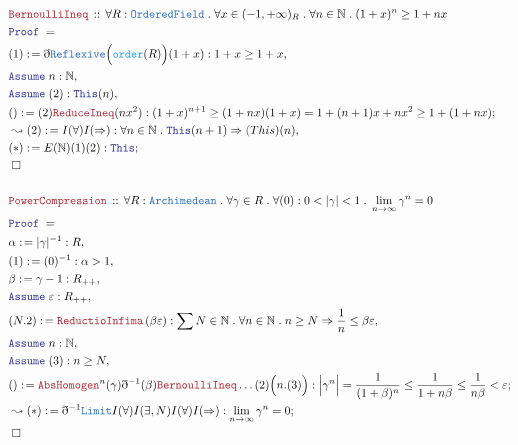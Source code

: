\documentclass[12pt]{scrartcl}
\newcommand{\TYPE}[1]{\textcolor{NavyBlue}{\mathtt{#1}}}
\newcommand{\FUNC}[1]{\textcolor{Cerulean}{\mathtt{#1}}}
\newcommand{\LOGIC}[1]{\textcolor{Blue}{\mathtt{#1}}}
\newcommand{\THM}[1]{\textcolor{Maroon}{\mathtt{#1}}}
\renewcommand{\.}{\; . \;}
\newcommand{\de}{: \kern 0.1pc =}
\newcommand{\Theorem}[2]{& \THM{#1} \, :: \, #2 \\ & \Proof = \\ }
\newcommand{\Page}[1]{ \begin{align*} #1 \end{align*}   }
\newcommand{ \bd }{ \ByDef }
\newcommand{\Nat}{\mathbb{N} }
\newcommand{\Say}[3]{& #1 \de #2 : #3, \\}
\newcommand{\Conclude}[3]{& #1 \de #2 : #3; \\}
\newcommand{\Derive}[3]{& \leadsto #1 \de #2 : #3, \\}
\newcommand{\DeriveConclude}[3]{& \leadsto #1 \de #2 : #3 ; \\}
\newcommand{\Assume}[2]{& \LOGIC{Assume} \;#1 : #2, \\}
\newcommand{\QED}{\; \square}
\newcommand{\EndProof}{& \QED \\}
\newcommand{\ByDef}{\eth}
\newcommand{\Proof}{\LOGIC{Proof} \; }
\begin{document}
\Page{
	\Theorem{BernoulliIneq}{ \forall R : \TYPE{OrderedField} \. 
		\forall  x \in (-1, +\infty)_R \. \forall n \in \Nat \.  (1 + x)^n \ge 1 + nx}
	\Say{(1)}{\bd \TYPE{Reflexive}\Big( \FUNC{order}(R) \Big)(1 + x)  }{  1 + x \ge 1 + x  }
	\Assume{n}{\Nat}
	\Assume{(2)}{\LOGIC{This}(n)}
	\Conclude{()}{ (2)\THM{ReduceIneq}(nx^2)   }
	{   (1 + x)^{n + 1} \ge  (1 + nx)( 1 + x) =  1  + (n + 1)x + nx^2 \ge 1 + (1 + nx) }
	\Derive{(2)}{I(\forall)I(\Rightarrow)}
	{ \forall n \in \Nat \. \LOGIC{This}(n + 1) \Rightarrow  \LOGIC(This)(n)}
	\Conclude{(*)}{E(\Nat)(1)(2)}{\LOGIC{This}}
	\EndProof
	\\
	\Theorem{PowerCompression}{\forall R : \TYPE{Archimedean} \. \forall \gamma \in R \. 
	 \forall (0) :  0 < |\gamma| < 1 \. 
		\lim_{n \to \infty} \gamma^n = 0  }
	\Say{\alpha}{|\gamma|^{-1}}{R}
	\Say{(1)}{(0)^{-1}}{ \alpha > 1 }
	\Say{\beta}{  \gamma - 1  }{R_{++}}
	\Assume{\varepsilon}{R_{++}}
	\Say{(N.2)}{ \THM{ReductioInfima}\left( \beta \varepsilon \right)  }
	{ \sum N \in \Nat \. \forall n \in \Nat \. n \ge N \Rightarrow  \frac{1}{n} \le \beta \varepsilon     }
	\Assume{n}{\Nat}
	\Assume{(3)}{n \ge N}
	\Conclude{()}{ \THM{AbsHomogen}^n(\gamma)  \bd^{-1}(\beta) \THM{BernoulliIneq}\ldots (2)\Big(n.(3)\Big)   }
	{  \Big| \gamma^n \Big| = \frac{1}{(1 + \beta )^n} 
	 \le \frac{1}{ 1 + n\beta  } \le \frac{1}{n\beta} < \varepsilon }
	\DeriveConclude{(*)}{\bd^{-1} \TYPE{Limit} I(\forall) I(\exists,N) I(\forall) I(\Rightarrow)}
	{  \lim_{n \to \infty} \gamma^n = 0  }
	\EndProof
}
\newpage
\end{document}
